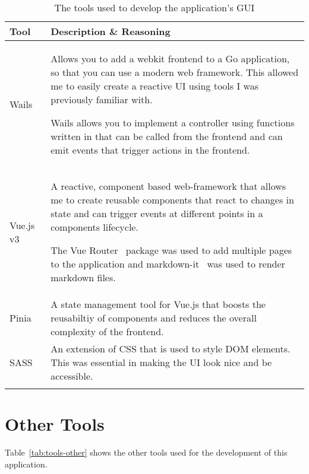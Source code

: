 \begin{longtable}{p{} p{}}
  \toprule
  \textbf{Tool} & \textbf{Description \& Reasoning}
  \\\midrule\midrule
  Wails~\cite{noauthor_wails_nodate}
  & Allows you to add a webkit frontend to a Go application, so that you can use a modern web framework. This allowed me to easily create a reactive UI using tools I was previously familiar with.

  Wails allows you to implement a controller using functions written in that can be called from the frontend and can emit events that trigger actions in the frontend.
  \\
  Vue.js v3~\cite{noauthor_vuejs_nodate}
  & A reactive, component based web-framework that allows me to create reusable components that react to changes in state and can trigger events at different points in a components lifecycle.
  
  The Vue Router~\cite{noauthor_vue_nodate} package was used to add multiple pages to the application and markdown-it~\cite{noauthor_markdown-it_2023} was used to render markdown files.
  \\
  Pinia~\cite{noauthor_pinia_nodate}
  & A state management tool for Vue.js that boosts the reusabiltiy of components and reduces the overall complexity of the frontend. 
  \\
  SASS~\cite{noauthor_sass_nodate}
  & An extension of CSS that is used to style DOM elements. This was essential in making the UI look nice and be accessible.
  \\
  \bottomrule\bottomrule
  \caption{The tools used to develop the application's GUI }
  \label{tab:tools-frontend}
\end{longtable}

\section{Other Tools}

Table~\ref{tab:tools-other} shows the other tools used for the development of this application.

